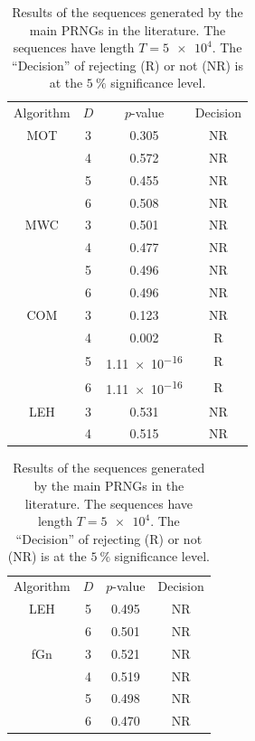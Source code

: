 \documentclass[alpha-refs]{wiley-article}
\begin{document}
\begin{table}
	\caption{Results of the sequences generated by the main PRNGs in the literature. 
		The sequences have length $T=\num[scientific-notation = true]{5 e4}$. 
		The ``Decision'' of rejecting (R) or not (NR) is at the $\SI{5}{\percent}$ significance level.}
	\label{Tab:LiteratureComparations}
	\centering
	\begin{tabular}{cccc}
		\toprule
		Algorithm & 
		\multicolumn{1}{c}{$D$} & 
		$p$-value &
		Decision\\
		\cmidrule(lr){1-1}
		\cmidrule(lr){2-2}
		\cmidrule(lr){3-3}
		\cmidrule(lr){4-4}
		MOT & 3 & 0.305 & NR\\
		& 4 & 0.572 & NR\\ 
		& 5 & 0.455 & NR\\ 
		& 6 & 0.508 & NR\\ 
		\cmidrule(lr){1-4}
		MWC & 3 & 0.501 & NR\\
		& 4 & 0.477 & NR\\ 
		& 5 & 0.496 & NR\\ 
		& 6 & 0.496 & NR\\ 
		\cmidrule(lr){1-4}
		COM & 3 & 0.123 & NR\\
		& 4 & 0.002 & R\\ 
		& 5 & \num[scientific-notation=true]{1.11 e-16} & R\\ 
		& 6 & \num[scientific-notation=true]{1.11 e-16} & R\\ 
		\cmidrule(lr){1-4}
		LEH & 3 & 0.531 & NR\\
		& 4 & 0.515 & NR\\ 
		\bottomrule
	\end{tabular}
	\begin{tabular}{|cccc}
		\toprule
		Algorithm & 
		\multicolumn{1}{c}{$D$} & 
		$p$-value &
		Decision\\
		\cmidrule(lr){1-1}
		\cmidrule(lr){2-2}
		\cmidrule(lr){3-3}
		\cmidrule(lr){4-4}
		LEH & 5 & 0.495 & NR\\ 
		& 6 & 0.501 & NR\\ 
		\cmidrule(lr){1-4}
		fGn & 3 & 0.521 & NR\\
		& 4 & 0.519 & NR\\ 
		& 5 & 0.498 & NR\\ 
		& 6 & 0.470 & NR\\
		\cmidrule(lr){1-4}

\end{tabular}
\end{table}
\end{document}
